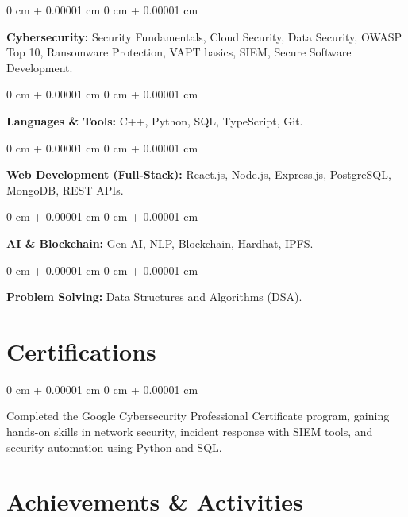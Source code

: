 \documentclass[10pt, letterpaper]{article}
\newenvironment{onecolentry}{
    \begin{adjustwidth}{
        0 cm + 0.00001 cm
    }{
        0 cm + 0.00001 cm
    }
}{
    \end{adjustwidth}
} %
\begin{document}
        \begin{onecolentry}
            \textbf{Cybersecurity:} Security Fundamentals, Cloud Security, Data Security, OWASP Top 10, Ransomware Protection, VAPT basics, SIEM, Secure Software Development.
        \end{onecolentry}

        \vspace{0.2 cm}

        \begin{onecolentry}
            \textbf{Languages \& Tools:} C++, Python, SQL, TypeScript, Git.
        \end{onecolentry}

        \vspace{0.2 cm}

        \begin{onecolentry}
            \textbf{Web Development (Full-Stack):} React.js, Node.js, Express.js, PostgreSQL, MongoDB, REST APIs.
        \end{onecolentry}

        \vspace{0.2 cm}

        \begin{onecolentry}
            \textbf{AI \& Blockchain:} Gen-AI, NLP, Blockchain, Hardhat, IPFS.
        \end{onecolentry}

        \vspace{0.2 cm}

        \begin{onecolentry}
            \textbf{Problem Solving:} Data Structures and Algorithms (DSA).
        \end{onecolentry}

    \section{Certifications}

        \begin{onecolentry}
            Completed the Google Cybersecurity Professional Certificate program, gaining hands-on skills in network security, incident response with SIEM tools, and security automation using Python and SQL.
        \end{onecolentry}

    \section{Achievements \& Activities}
\end{document}
